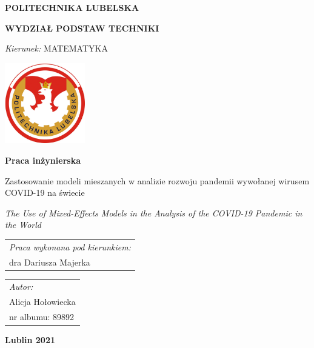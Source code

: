 \documentclass[12pt]{mwbk}
\theoremstyle{plain}
\theoremstyle{definition}
\theoremstyle{definition}
\begin{document}

\thispagestyle{empty}  %


\newcommand\tytul{Zastosowanie modeli mieszanych w analizie rozwoju pandemii wywołanej wirusem COVID-19 na świecie}

\newcommand\tytulangielski{The Use of Mixed-Effects Models in the Analysis of the COVID-19 Pandemic in the World}


\begin{center}


{\large \bf POLITECHNIKA LUBELSKA}

{\bf WYDZIAŁ PODSTAW TECHNIKI}

\emph{Kierunek:} MATEMATYKA


\vfill %
     

\includegraphics[width=3.5cm]{rys/logopl}

\vfill

\textbf{Praca inżynierska}

\vfill
\vfill
\vfill

\large
\tytul

\vfill

\emph{\tytulangielski}


\vfill
\vfill
\vfill
\vfill
\vfill

\begin{tabular}[t]{l}
\emph{Praca wykonana pod kierunkiem:}
\\
dra Dariusza Majerka
\end{tabular}
\hfill
\begin{tabular}[t]{l}
	\emph{Autor:}
\\
Alicja Hołowiecka\\
nr albumu: 89892 
\end{tabular}

\vfill
\vfill
\vfill

\textbf{Lublin 2021}

\end{center}
\end{document}

